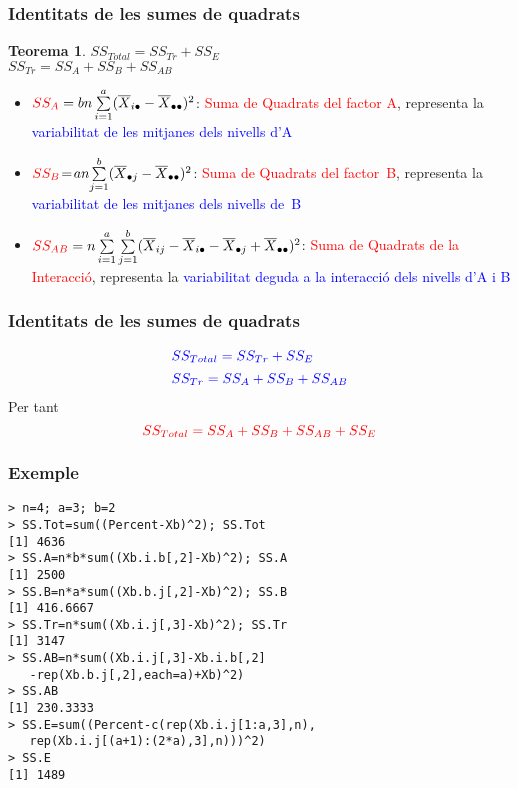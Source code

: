 \documentclass[12pt,t]{beamer}
\newcommand{\red}[1]{\textcolor{red}{#1}}
\newcommand{\blue}[1]{\textcolor{blue}{#1}}
\theoremstyle{plain}
\newtheorem{teorema}{Teorema}
\theoremstyle{definition}
\begin{document}
\begin{frame}
\frametitle{Identitats de les sumes de quadrats}\vspace*{-2ex} 

\begin{teorema}
$SS_{Total} = SS_{Tr}+SS_E$\\[1ex]
$SS_{Tr} = SS_A+SS_B+SS_{AB}$
\end{teorema}

\begin{itemize}

\item  $\red{SS_A} =b n\sum\limits_{i=1}^a
(\overline{X}_{i\bullet}-\overline{X}_{\bullet\bullet})^2$: \red{Suma de Quadrats del factor A}, representa la \blue{variabilitat 
de les mitjanes dels nivells d'A}


\item  $\red{SS_B}\! =\!a n\!\sum\limits_{j=1}^b (\overline{X}_{\bullet
j}-\overline{X}_{\bullet\bullet})^2$: \red{Suma de Quadrats del factor~B}, representa la \blue{variabilitat 
de les mitjanes dels nivells de~B}

\item $\red{SS_{AB}}=n \sum\limits_{i=1}^a\sum\limits_{j=1}^b
(\overline{X}_{ij}-\overline{X}_{i\bullet}-\overline{X}_{\bullet
j}+\overline{X}_{\bullet\bullet})^2$: \red{Suma de Quadrats de la Interacció}, representa la \blue{variabilitat 
deguda a la interacció dels nivells d'A i B}


\end{itemize}

\end{frame}


\begin{frame}
\frametitle{Identitats de les sumes de quadrats}\vspace*{-2ex} 

$$
\begin{array}{l}
\blue{SS_{Total} = SS_{Tr}+SS_E}\\[1ex]
\blue{SS_{Tr} = SS_A+SS_B+SS_{AB}}
\end{array}
$$
Per tant
$$
\red{SS_{Total} = SS_A+SS_B+SS_{AB}+SS_E}
 $$
\end{frame}





\begin{frame}[fragile]
\frametitle{Exemple}\vspace*{-2ex} 

\begin{lstlisting}
> n=4; a=3; b=2
> SS.Tot=sum((Percent-Xb)^2); SS.Tot
[1] 4636
> SS.A=n*b*sum((Xb.i.b[,2]-Xb)^2); SS.A
[1] 2500
> SS.B=n*a*sum((Xb.b.j[,2]-Xb)^2); SS.B
[1] 416.6667
> SS.Tr=n*sum((Xb.i.j[,3]-Xb)^2); SS.Tr
[1] 3147
> SS.AB=n*sum((Xb.i.j[,3]-Xb.i.b[,2]
   -rep(Xb.b.j[,2],each=a)+Xb)^2)
> SS.AB
[1] 230.3333
> SS.E=sum((Percent-c(rep(Xb.i.j[1:a,3],n),
   rep(Xb.i.j[(a+1):(2*a),3],n)))^2)
> SS.E
[1] 1489
\end{lstlisting}

\end{frame}
\end{document}
